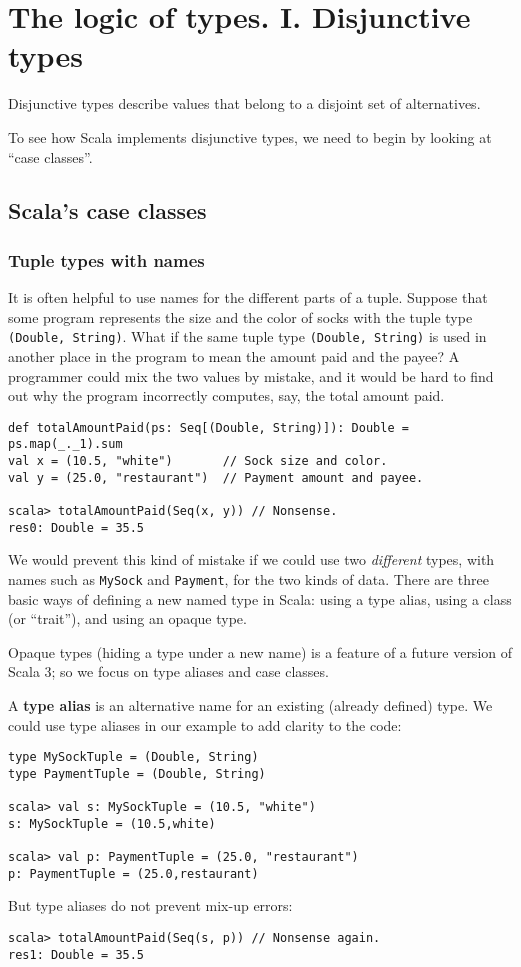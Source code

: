 
\chapter{The logic of types. I. Disjunctive types\label{chap:Disjunctive-types}}

Disjunctive types describe values that belong to a disjoint set of
alternatives. 

To see how Scala implements disjunctive types, we need to begin by
looking at ``case classes''.

\section{Scala's case classes}

\subsection{Tuple types with names}

It is often helpful to use names for the different parts of a tuple.
Suppose that some program represents the size and the color of socks
with the tuple type \lstinline!(Double, String)!. What if the same
tuple type \lstinline!(Double, String)! is used in another place
in the program to mean the amount paid and the payee? A programmer
could mix the two values by mistake, and it would be hard to find
out why the program incorrectly computes, say, the total amount paid.
\begin{lstlisting}
def totalAmountPaid(ps: Seq[(Double, String)]): Double = ps.map(_._1).sum
val x = (10.5, "white")       // Sock size and color.
val y = (25.0, "restaurant")  // Payment amount and payee.

scala> totalAmountPaid(Seq(x, y)) // Nonsense.
res0: Double = 35.5
\end{lstlisting}

We would prevent this kind of mistake if we could use two \emph{different}
types, with names such as \lstinline!MySock! and \lstinline!Payment!,
for the two kinds of data. There are  three basic ways of defining
a new named type in Scala: using a type alias, using a class (or ``trait''),
and using an opaque type. 

Opaque types (hiding a type under a new name) is a feature of a future
version of Scala 3; so we focus on type aliases and case classes.

A \textbf{type alias} is an alternative name for
an existing (already defined) type. We could use type aliases in our
example to add clarity to the code:
\begin{lstlisting}
type MySockTuple = (Double, String)
type PaymentTuple = (Double, String)

scala> val s: MySockTuple = (10.5, "white")
s: MySockTuple = (10.5,white)

scala> val p: PaymentTuple = (25.0, "restaurant")
p: PaymentTuple = (25.0,restaurant)
\end{lstlisting}
But type aliases do not prevent mix-up errors:
\begin{lstlisting}
scala> totalAmountPaid(Seq(s, p)) // Nonsense again.
res1: Double = 35.5
\end{lstlisting}


